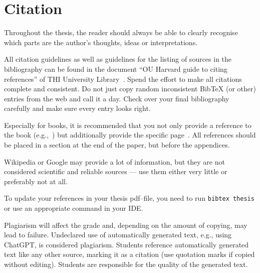 \chapter{Citation}

Throughout the thesis, the reader should always be able to clearly recognise which
parts are the author's thoughts, ideas or interpretations. 

All citation guidelines as well as guidelines for the listing of sources in the
bibliography can be found in the document \enquote{OU Harvard guide to citing references}
of THI University Library~\cite{THI23}. Spend the effort to make all citations complete
and consistent. Do not just copy random inconsistent BibTeX (or other) entries from the
web and call it a day. Check over your final bibliography carefully and make sure every
entry looks right.~\cite{JW06} 

Especially for books, it is recommended that you not only provide a reference to the book
(e.g.,~\cite{BertGal92}) but additionally provide the specific page~\cite[p. 123]{Cov12}.
All references should be placed in a section at the end of the paper, but before the
appendices.

Wikipedia or Google may provide a lot of information, but they are not considered
scientific and reliable sources --- use them either very little or preferably not at all.

To update your references in your thesis pdf--file, you need to run \texttt{bibtex
thesis} or use an appropriate command in your IDE.

Plagiarism will affect the grade and, depending on the amount of copying, may lead to
failure. Undeclared use of automatically generated text, e.g., using ChatGPT, is
considered plagiarism. Students reference automatically generated text like any other
source, marking it as a citation (use quotation marks if copied without editing). Students
are responsible for the quality of the generated text.
